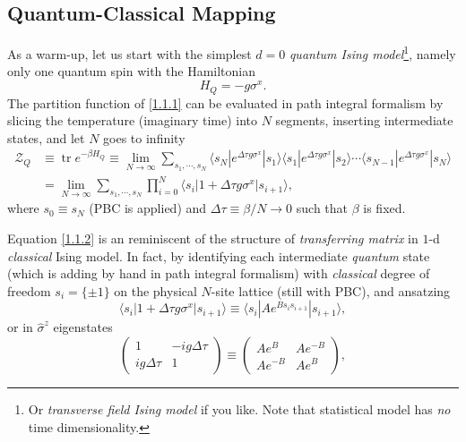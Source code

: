 \documentclass[10pt,nofootinbib]{revtex4}
\newcounter{Note}[section]
\numberwithin{equation}{section}
\begin{document}
	\subsection{Quantum-Classical Mapping}
		As a warm-up, let us start with the simplest $d=0$ \emph{quantum Ising model}\footnote{Or \emph{transverse field Ising model} if you like. Note that statistical model has \emph{no} time dimensionality.}, namely only one quantum spin with the Hamiltonian
		\begin{equation}\label{1.1.1}
			H_{Q}=-g\sigma^x.
		\end{equation}
		The partition function of \eqref{1.1.1} can be evaluated in path integral formalism by slicing the temperature (imaginary time) into $N$ segments, inserting intermediate states, and {\color{red}let $N$ goes to infinity}
		\begin{align}\label{1.1.2}
			\mathcal{Z}_{Q}&\equiv\mathop{\mathrm{tr}}e^{-\beta H_Q}\equiv\lim_{N\rightarrow\infty}\sum_{s_1,\cdots,s_N}\langle s_N|e^{\Delta\tau g\sigma^x}|s_1\rangle \langle s_1|e^{\Delta\tau g\sigma^x}|s_2\rangle\cdots \langle s_{N-1}|e^{\Delta\tau g\sigma^x}|s_N\rangle\nonumber\\
			&=\lim_{N\rightarrow\infty}\sum_{s_1,\cdots,s_N}\prod_{i=0}^N\langle s_i|1+\Delta\tau g\sigma^x|s_{i+1}\rangle,
		\end{align}
		where $s_0\equiv s_N$ (PBC is applied) and $\Delta\tau\equiv\beta/N\rightarrow0$ such that $\beta$ is fixed.\par
		Equation \eqref{1.1.2} is an reminiscent of the structure of \emph{transferring matrix} in $1$-d \emph{classical} Ising model. In fact, by identifying each intermediate \emph{quantum} state (which is adding by hand in path integral formalism) with \emph{classical} degree of freedom $s_i=\{\pm1\}$ on the physical $N$-site lattice (still with PBC), and ansatzing
		\begin{equation*}
			\langle s_i|1+\Delta\tau g\sigma^x|s_{i+1}\rangle\equiv\langle s_i|Ae^{Bs_i s_{i+1}}|s_{i+1}\rangle,
		\end{equation*}
		or in $\hat{\sigma}^z$ eigenstates
		\begin{equation*}
			\left(\begin{array}{cc}
				1&-ig\Delta\tau\\
				ig\Delta\tau&1
			\end{array}\right)\equiv \left(\begin{array}{cc}
				Ae^B&Ae^{-B}\\Ae^{-B}&Ae^B
			\end{array}\right),
		\end{equation*}
\end{document}

